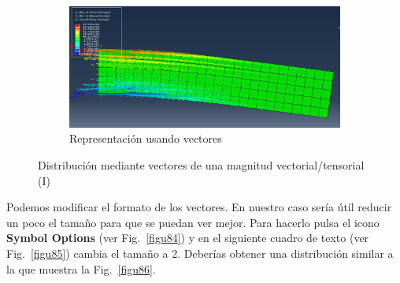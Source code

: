 \begin{enumerate}
\begin{figure}[H]
\begin{subfigure}{0.29\textwidth}
      \label{figu82}
    \end{subfigure}%
    ~ %
    \begin{subfigure}{0.55\textwidth}
      \includegraphics[width=\textwidth]{./body/images/imagen83}
      \caption{Representación usando vectores}
      \label{figu83}
    \end{subfigure}%
    \caption{Distribución mediante vectores de una magnitud
      vectorial/tensorial (I)}
  \end{figure}

  Podemos modificar el formato de los vectores. En nuestro caso sería
  útil reducir un poco el tamaño para que se puedan ver mejor. Para
  hacerlo pulsa el icono \textbf{Symbol Options} (ver
  Fig.~\ref{figu84}) y en el siguiente cuadro de texto (ver
  Fig.~\ref{figu85}) cambia el tamaño a 2. Deberías obtener una
  distribución similar a la que muestra la Fig.~\ref{figu86}.


\end{enumerate}
